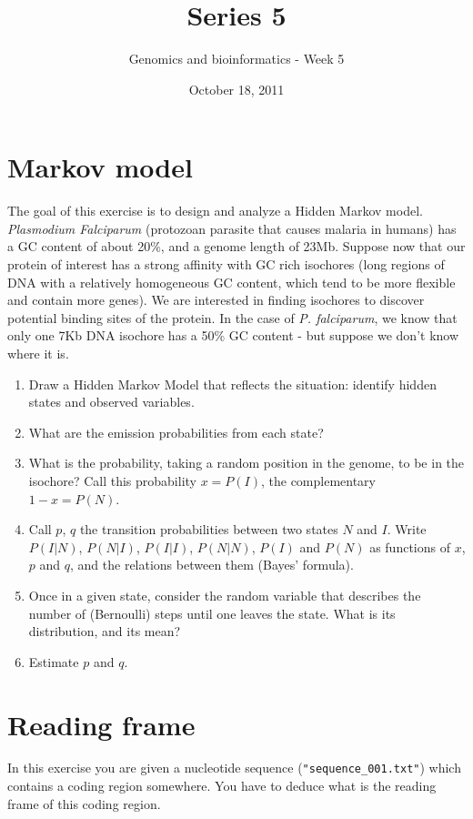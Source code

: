 \documentclass[a4paper,11pt]{article}
\title{Series 5}
\date{October 18, 2011}
\author{Genomics and bioinformatics - Week 5}
\begin{document}
\maketitle

\section{Markov model}
The goal of this exercise is to design and analyze a Hidden Markov model. \\
\emph{Plasmodium Falciparum} (protozoan parasite that causes malaria in humans) has a GC content of about 20\%, and a genome length of 23Mb. Suppose now that our protein of interest has a strong affinity with GC rich isochores (long regions of DNA with a relatively homogeneous GC content, which tend to be more flexible and contain more genes). We are interested in finding isochores to discover potential binding sites of the protein. In the case of \emph{P. falciparum}, we know that only one 7Kb DNA isochore has a 50\% GC content - but suppose we don't know where it is.
\begin{enumerate}
\item Draw a Hidden Markov Model that reflects the situation: identify hidden states and observed variables.
\item What are the emission probabilities from each state?
\item What is the probability, taking a random position in the genome, to be in the isochore? Call this probability $x = P(I)$, the complementary $1-x = P(N)$.
\item Call $p$, $q$ the transition probabilities between two states $N$ and $I$. Write $P(I|N)$, $P(N|I)$, $P(I|I)$, $P(N|N)$, $P(I)$ and $P(N)$ as functions of $x$, $p$ and $q$, and the relations between them (Bayes' formula).
\item Once in a given state, consider the random variable that describes the number of (Bernoulli) steps until one leaves the state. What is its distribution, and its mean?
\item Estimate $p$ and $q$.
\end{enumerate}

\section{Reading frame}
In this exercise you are given a nucleotide sequence (\texttt{"sequence\_001.txt"}) which contains a coding region somewhere. You have to deduce what is the reading frame of this coding region.
\end{document}
